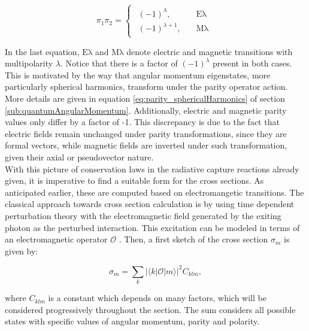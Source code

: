\documentclass[openany]{book}
\begin{document}
\begin{equation} \label{eq:radiativeCapture_parity}
	\pi_1 \pi_2 = 	\left\{\begin{array}{l}
		\begin{split}
			(-1)^{\lambda}, \quad & \mathrm{E\lambda} \\ 
			(-1)^{\lambda + 1}, \quad & \mathrm{M\lambda}
		\end{split}
	\end{array}\right.
\end{equation}

In the last equation, $\mathrm{E\lambda}$ and $\mathrm{M\lambda}$ denote electric and magnetic transitions with multipolarity $\lambda$.  Notice that there is a factor of $(-1)^\lambda$ present in both cases. This is motivated by the way that angular momentum eigenstates, more particularly spherical harmonics, transform under the parity operator action. More details are given in equation \ref{eq:parity_sphericalHarmonics} of section \ref{sub:quantumAngularMomentum}. Additionally, electric and magnetic parity values only differ by a factor of -1. This discrepancy is due to the fact that electric fields remain unchanged under parity transformations, since they are formal vectors, while magnetic fields are inverted under such transformation, given their axial or pseudovector nature.   \\

With this picture of conservation laws in the radiative capture reactions already given, it is imperative to find a suitable form for the cross sections. As anticipated earlier, these are computed based on electromangetic transitions. The classical approach towards cross section calculation is by using time dependent perturbation theory with the electromagnetic field generated by the exiting photon as the perturbed interaction. This excitation can be modeled in terms of an electromagnetic operator $\mathcal{O}$ \cite{huang_bertulani_guimaraes_2010}. Then, a first sketch of the cross section $\sigma_m$ is given by: 

\begin{equation}  \label{eq:radiativeCapture_crossSection}
	\sigma_m = \sum_{k}{|\langle k | \mathcal{O} | m \rangle|^2} C_{klm},		
\end{equation}

where $C_{klm}$ is a constant which depends on many factors, which will be considered progressively throughout the section. The sum considers all possible states with specific values of angular momentum, parity and polarity. \\
\end{document}
